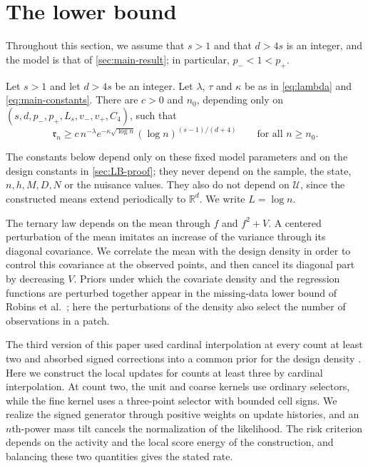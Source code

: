 \chapter{The lower bound}\label{sec:lower}

Throughout this section, we assume that $s>1$ and that $d>4s$ is an
integer, and the model is that of \cref{sec:main-result}; in
particular, $p_-<1<p_+$.

\begin{theorem}\label{thm:lower}
Let $s>1$ and let $d>4s$ be an integer. Let $\lambda$, $\tau$ and
$\kappa$ be as in \eqref{eq:lambda} and \eqref{eq:main-constants}.
There are $c>0$ and $n_0$, depending only on
$(s,d,p_-,p_+,L_s,v_-,v_+,C_4)$, such that
\[
 \mathfrak r_n\ge c\,n^{-\lambda}e^{-\kappa\sqrt{\log n}}
 (\log n)^{(s-1)/(d+4)}
 \qquad\text{for all }n\ge n_0 .
\]
\end{theorem}

The constants below depend only on these fixed model parameters and
on the design constants in \cref{sec:LB-proof}; they never depend on
the sample, the state, $n,h,M,D,N$ or the nuisance values. They also
do not depend on $\mathcal U$, since the constructed means extend
periodically to $\mathbb R^d$. We write $L=\log n$.

The ternary law depends on the mean through $f$ and $f^2+V$.
A centered perturbation of the mean imitates an increase of the
variance through its diagonal covariance. We correlate the mean with
the design density in order to control this covariance at the observed
points, and then cancel its diagonal part by decreasing $V$. Priors
under which the covariate density and the regression functions are
perturbed together appear in the missing-data lower bound of Robins et
al.\ \cite[Section~3]{RobinsEtAl2009EJS}; here the perturbations of the
density also select the number of observations in a patch.

The third version of this paper used cardinal interpolation at every
count at least two and absorbed signed corrections into a common prior
for the design density \cite[Section~1.2, Steps~1--2, and
Appendix~B]{AronowLopatto2026v3}.
Here we construct the local updates for counts at least three by
cardinal interpolation. At count two, the unit and coarse kernels use ordinary
selectors, while the fine kernel uses a three-point selector with
bounded cell signs. We realize the signed generator through positive
weights on update histories, and an $n$th-power mass tilt cancels the
normalization of the likelihood. The risk criterion depends on the
activity and the local score energy of the construction, and balancing
these two quantities gives the stated rate.

